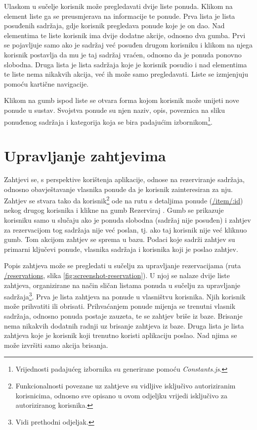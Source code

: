 \documentclass[times, utf8, zavrsni, numeric]{fer}
\newcommand{\razmaks}{\vspace{10pt}}
\begin{document}
\razmaks

Ulaskom u sučelje korisnik može pregledavati dvije liste ponuda.
Klikom na element liste ga se preusmjerava na informacije te ponude.
Prva lista je lista posuđenih sadržaja, gdje korisnik pregledava ponude koje je on dao.
Nad elementima te liste korisnik ima dvije dodatne akcije, odnosno dva gumba.
Prvi se pojavljuje samo ako je sadržaj već posuđen drugom korisniku i klikom na njega korisnik postavlja da mu je taj sadržaj vraćen, odnosno da je ponuda ponovno slobodna.
Druga lista je lista sadržaja koje je korisnik posudio i nad elementima te liste nema nikakvih akcija, već ih može samo pregledavati.
Liste se izmjenjuju pomoću kartične navigacije.

Klikom na gumb ispod liste se otvara forma kojom korisnik može unijeti nove ponude u sustav.
Svojstva ponude su njen naziv, opis, poveznica na sliku ponuđenog sadržaja i kategorija koja se bira padajućim izbornikom\footnote{Vrijednosti padajućeg izbornika su generirane pomoću \emph{Constants.js}.}.

\newpage


\section{Upravljanje zahtjevima}

Zahtjevi se, s perspektive korištenja aplikacije, odnose na rezerviranje sadržaja, odnosno obavještavanje vlasnika ponude da je korisnik zainteresiran za nju.
Zahtjev se stvara tako da korisnik\footnote{Funkcionalnosti povezane uz zahtjeve su vidljive isključivo autoriziranim korisnicima, odnosno sve opisano u ovom odjeljku vrijedi isključivo za autoriziranog korisnika.} ode na rutu s detaljima ponude (\glqq \url{/item/:id}\grqq ) nekog drugog korisnika i klikne na gumb \glqq Rezerviraj \grqq . 
Gumb se prikazuje korisniku samo u slučaju ako je ponuda slobodna (sadržaj nije posuđen) i zahtjev za rezervacijom tog sadržaja nije već poslan, tj. ako taj korisnik nije već kliknuo gumb.
Tom akcijom zahtjev se sprema u bazu.
Podaci koje sadrži zahtjev su primarni ključevi ponude, vlasnika sadržaja i korisnika koji je poslao zahtjev.

Popis zahtjeva može se pregledati u sučelju za upravljanje rezervacijama (ruta \glqq \url{/reservations}\grqq , slika \ref{fig:screenshot-reservation}).
U njoj se nalaze dvije liste zahtjeva, organizirane na način sličan listama ponuda u sučelju za upravljanje sadržaja\footnote{Vidi prethodni odjeljak.}.
Prva je lista zahtjeva na ponude u vlasništvu korisnika.
Njih korisnik može prihvatiti ili obrisati.
Prihvaćanjem ponude mijenja se trenutni vlasnik sadržaja, odnosno ponuda postaje zauzeta, te se zahtjev briše iz baze.
Brisanje nema nikakvih dodatnih radnji uz brisanje zahtjeva iz baze.
Druga lista je lista zahtjeva koje je korisnik koji trenutno koristi aplikaciju poslao.
Nad njima se može izvršiti samo akcija brisanja.
\end{document}
